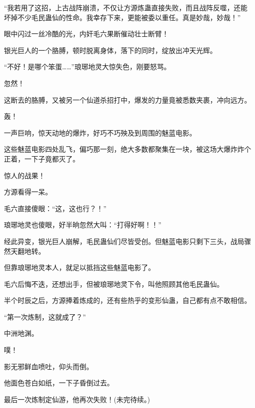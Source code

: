 \begin{this_body}
“我若用了这招，上古战阵崩溃，不仅让方源炼蛊直接失败，而且战阵反噬，还能坏掉不少毛民蛊仙的性命。我幸存下来，更能被委以重任。真是妙哉，妙哉！”

眼中闪过一丝冷酷的光，内奸毛六果断催动壮士断臂！

银光巨人的一个胳膊，顿时脱离身体，落下的同时，绽放出冲天光辉。

“不好！是哪个笨蛋……”琅琊地灵大惊失色，刚要怒骂。

忽然！

这断去的胳膊，又被另一个仙道杀招打中，爆发的力量竟被悉数夹裹，冲向远方。

轰！

一声巨响，惊天动地的爆炸，好巧不巧殃及到周围的魅蓝电影。

这些魅蓝电影四处乱飞，偏巧那一刻，绝大多数都聚集在一块，被这场大爆炸炸个正着，一下子竟都灭了。

惊人的战果！

方源看得一呆。

毛六直接傻眼：“这，这也行？！”

琅琊地灵也傻眼，好半晌忽然大叫：“打得好啊！！”

经此异变，银光巨人崩解，毛民蛊仙们尽皆受创。但魅蓝电影只剩下三头，战局骤然天翻地转。

但靠琅琊地灵本人，就足以抵挡这些魅蓝电影了。

毛六后悔不迭，还想出手，但被琅琊地灵下令，叫他照顾其他毛民蛊仙。

半个时辰之后，方源捧着炼成的，还有些热乎的变形仙蛊，自己都有点不敢相信。

“第一次炼制，这就成了？”

中洲地渊。

噗！

影无邪鲜血喷吐，仰头而倒。

他面色苍白如纸，一下子昏倒过去。

最后一次炼制定仙游，他再次失败！(未完待续。)

\end{this_body}

